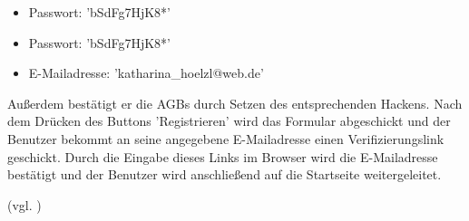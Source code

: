 \documentclass[a4paper]{scrreprt}
\begin{document}
\begin{itemize}
\begin{itemize}
\begin{itemize}
								\item Passwort: 'bSdFg7HjK8*'
								\item Passwort: 'bSdFg7HjK8*'

								\item E-Mailadresse: 'katharina\_hoelzl@web.de'
							\end{itemize}
						Außerdem bestätigt er die AGBs durch Setzen des entsprechenden Hackens. Nach dem Drücken des Buttons 'Registrieren' wird das Formular abgeschickt und der Benutzer bekommt an seine angegebene E-Mailadresse einen Verifizierungslink geschickt. Durch die Eingabe dieses Links im Browser wird die E-Mailadresse bestätigt und der Benutzer wird anschließend auf die Startseite weitergeleitet.			
				\end{itemize}	
			(vgl. )
		\end{itemize}
		
\end{document}
